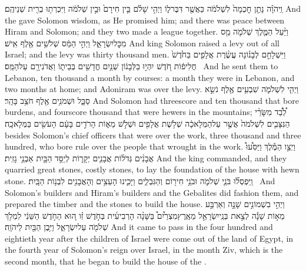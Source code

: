 \setcounter{chap}{5}
\setcounter{verse}{26}
{וַֽיהֹוָ֗ה נָתַ֤ן חׇכְמָה֙ לִשְׁלֹמֹ֔ה כַּאֲשֶׁ֖ר דִּבֶּר\maqqaf ל֑וֹ וַיְהִ֣י שָׁלֹ֗ם בֵּ֤ין חִירָם֙ וּבֵ֣ין שְׁלֹמֹ֔ה וַיִּכְרְת֥וּ בְרִ֖ית שְׁנֵיהֶֽם׃}
{And the \lord\space gave Solomon wisdom, as He promised him; and there was peace between Hiram and Solomon; and they two made a league together.}
{וַיַּ֨עַל הַמֶּ֧לֶךְ שְׁלֹמֹ֛ה מַ֖ס מִכׇּל\maqqaf יִשְׂרָאֵ֑ל וַיְהִ֣י הַמַּ֔ס שְׁלֹשִׁ֥ים אֶ֖לֶף אִֽישׁ׃}
{And king Solomon raised a levy out of all Israel; and the levy was thirty thousand men.}
{וַיִּשְׁלָחֵ֣ם לְבָנ֗וֹנָה עֲשֶׂ֨רֶת אֲלָפִ֤ים בַּחֹ֙דֶשׁ֙ חֲלִיפ֔וֹת חֹ֚דֶשׁ יִהְי֣וּ בַלְּבָנ֔וֹן שְׁנַ֥יִם חֳדָשִׁ֖ים בְּבֵית֑וֹ וַאֲדֹנִירָ֖ם עַל\maqqaf הַמַּֽס׃ \setuma }
{And he sent them to Lebanon, ten thousand a month by courses: a month they were in Lebanon, and two months at home; and Adoniram was over the levy.}
{וַיְהִ֧י לִשְׁלֹמֹ֛ה שִׁבְעִ֥ים אֶ֖לֶף נֹשֵׂ֣א סַבָּ֑ל וּשְׁמֹנִ֥ים אֶ֖לֶף חֹצֵ֥ב בָּהָֽר׃}
{And Solomon had threescore and ten thousand that bore burdens, and fourscore thousand that were hewers in the mountains;}
{לְ֠בַ֠ד מִשָּׂרֵ֨י הַנִּצָּבִ֤ים לִשְׁלֹמֹה֙ אֲשֶׁ֣ר עַל\maqqaf הַמְּלָאכָ֔ה שְׁלֹ֥שֶׁת אֲלָפִ֖ים וּשְׁלֹ֣שׁ מֵא֑וֹת הָרֹדִ֣ים בָּעָ֔ם הָעֹשִׂ֖ים בַּמְּלָאכָֽה׃ \setuma }
{besides Solomon’s chief officers that were over the work, three thousand and three hundred, who bore rule over the people that wrought in the work.}
{וַיְצַ֣ו הַמֶּ֡לֶךְ וַיַּסִּ֩עוּ֩ אֲבָנִ֨ים גְּדֹל֜וֹת אֲבָנִ֧ים יְקָר֛וֹת לְיַסֵּ֥ד הַבָּ֖יִת אַבְנֵ֥י גָזִֽית׃}
{And the king commanded, and they quarried great stones, costly stones, to lay the foundation of the house with hewn stone.}
{וַֽיִּפְסְל֞וּ בֹּנֵ֧י שְׁלֹמֹ֛ה וּבֹנֵ֥י חִיר֖וֹם וְהַגִּבְלִ֑ים וַיָּכִ֛ינוּ הָעֵצִ֥ים וְהָאֲבָנִ֖ים לִבְנ֥וֹת הַבָּֽיִת׃ \petucha }
{And Solomon’s builders and Hiram’s builders and the Gebalites did fashion them, and prepared the timber and the stones to build the house.}
\newperek
{}
{וַיְהִ֣י בִשְׁמוֹנִ֣ים שָׁנָ֣ה וְאַרְבַּ֣ע מֵא֣וֹת שָׁנָ֡ה לְצֵ֣את בְּנֵֽי\maqqaf יִשְׂרָאֵ֣ל מֵאֶֽרֶץ\maqqaf מִצְרַ֩יִם֩ בַּשָּׁנָ֨ה הָרְבִיעִ֜ית בְּחֹ֣דֶשׁ זִ֗ו ה֚וּא הַחֹ֣דֶשׁ הַשֵּׁנִ֔י לִמְלֹ֥ךְ שְׁלֹמֹ֖ה עַל\maqqaf יִשְׂרָאֵ֑ל וַיִּ֥בֶן הַבַּ֖יִת לַיהֹוָֽה׃}
{And it came to pass in the four hundred and eightieth year after the children of Israel were come out of the land of Egypt, in the fourth year of Solomon’s reign over Israel, in the month Ziv, which is the second month, that he began to build the house of the \lord.}
